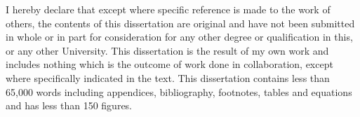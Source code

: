 

\begin{declaration}

I hereby declare that except where specific reference is made to the work of others, the contents of this dissertation are original and have not been submitted in whole or in part for consideration for any other degree or qualification in this, or any other University. This dissertation is the result of my own work and includes nothing which is the outcome of work done in collaboration, except where specifically indicated in the text. This dissertation contains less than 65,000 words including appendices, bibliography, footnotes, tables and equations and has less than 150 figures.


\end{declaration}
